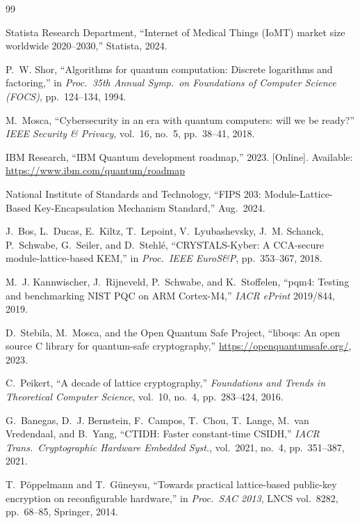 \documentclass[10pt,journal,compsoc]{IEEEtran}
\begin{document}

\begin{thebibliography}{99}

Statista Research Department, ``Internet of Medical Things (IoMT)
market size worldwide 2020--2030,'' Statista, 2024.

P.~W. Shor, ``Algorithms for quantum computation: Discrete logarithms
and factoring,'' in \emph{Proc.\ 35th Annual Symp.\ on Foundations of
Computer Science (FOCS)}, pp.~124--134, 1994.

M.~Mosca, ``Cybersecurity in an era with quantum computers: will we be
ready?'' \emph{IEEE Security \& Privacy}, vol.~16, no.~5,
pp.~38--41, 2018.

IBM Research, ``IBM Quantum development roadmap,'' 2023.
[Online]. Available: \url{https://www.ibm.com/quantum/roadmap}

National Institute of Standards and Technology,
``FIPS 203: Module-Lattice-Based Key-Encapsulation Mechanism
Standard,'' Aug.\ 2024.

J.~Bos, L.~Ducas, E.~Kiltz, T.~Lepoint, V.~Lyubashevsky,
J.~M. Schanck, P.~Schwabe, G.~Seiler, and D.~Stehlé,
``CRYSTALS-Kyber: A CCA-secure module-lattice-based KEM,''
in \emph{Proc.\ IEEE EuroS\&P}, pp.~353--367, 2018.

M.~J. Kannwischer, J.~Rijneveld, P.~Schwabe, and K.~Stoffelen,
``pqm4: Testing and benchmarking NIST PQC on ARM Cortex-M4,''
\emph{IACR ePrint} 2019/844, 2019.

D.~Stebila, M.~Mosca, and the Open Quantum Safe Project,
``liboqs: An open source C library for quantum-safe cryptography,''
\url{https://openquantumsafe.org/}, 2023.

C.~Peikert, ``A decade of lattice cryptography,''
\emph{Foundations and Trends in Theoretical Computer Science},
vol.~10, no.~4, pp.~283--424, 2016.

G.~Banegas, D.~J. Bernstein, F.~Campos, T.~Chou, T.~Lange,
M.~van Vredendaal, and B.~Yang,
``CTIDH: Faster constant-time CSIDH,''
\emph{IACR Trans.\ Cryptographic Hardware Embedded Syst.},
vol.\ 2021, no.\ 4, pp.\ 351--387, 2021.

T.~Pöppelmann and T.~Güneysu, ``Towards practical lattice-based
public-key encryption on reconfigurable hardware,''
in \emph{Proc.\ SAC 2013}, LNCS vol.\ 8282, pp.\ 68--85,
Springer, 2014.


\end{thebibliography}
\end{document}
